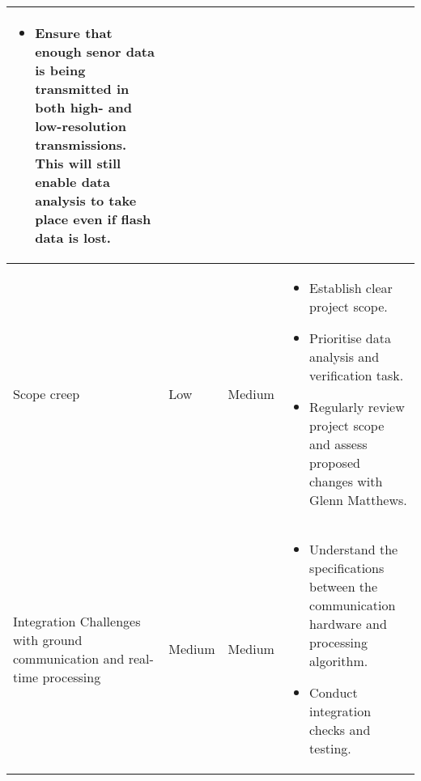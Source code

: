 \begin{table}[]
\begin{tabular}{>{\raggedright}p{4cm}p{1.5cm}p{1.5cm}p{7cm}}
\begin{itemize}[leftmargin=*]
  \item Ensure that enough senor data is being transmitted in both high- and low-resolution transmissions. This will still enable data analysis to take place even if flash data is lost.
\end{itemize}\\\midrule
Scope creep & Low & Medium & \vspace{-1.5em}
\begin{itemize}[leftmargin=*]
  \item Establish clear project scope.  
  \item Prioritise data analysis and verification task.  
  \item Regularly review project scope and assess proposed changes with Glenn Matthews.
\end{itemize}\\\midrule
Integration Challenges with ground communication and real-time processing & Medium & Medium & \vspace{-1.5em}
\begin{itemize}[leftmargin=*]
  \item Understand the specifications between the communication hardware and processing algorithm. 
  \item Conduct integration checks and testing.
\end{itemize}\\
\bottomrule
\end{tabular}
\end{table}
